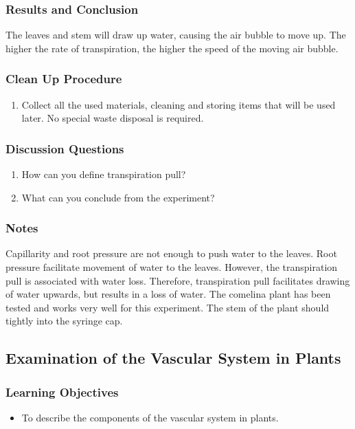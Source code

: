 \subsubsection*{Results and Conclusion}
The leaves and stem will draw up water, causing the air bubble to move up. The higher the rate of transpiration, the higher the speed of the moving air bubble.

\subsubsection*{Clean Up Procedure}
\begin{enumerate}
\item{Collect all the used materials, cleaning and storing items that will be used later. No special waste disposal is required.}
\end{enumerate}

\subsubsection*{Discussion Questions}
\begin{enumerate}
\item{How can you define transpiration pull?}
\item{What can you conclude from the experiment?}
\end{enumerate}

\subsubsection*{Notes}
Capillarity and root pressure are not enough to push water to the leaves. Root pressure facilitate movement of water to the leaves. However, the transpiration pull is associated with water loss. Therefore, transpiration pull facilitates drawing of water upwards, but results in a loss of water. The comelina plant has been tested and works very well for this experiment. The stem of the plant should tightly into the syringe cap.


\subsection{Examination of the Vascular System in Plants}

\subsubsection*{Learning Objectives}
\begin{itemize}
\item{To describe the components of the vascular system in plants.}
\end{itemize}


